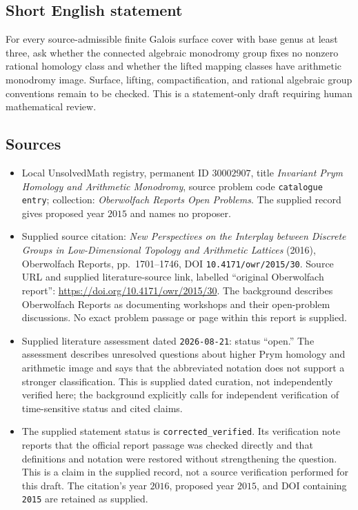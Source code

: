 \documentclass[11pt]{article}
\begin{document}
\subsection{Short English statement}
For every source-admissible finite Galois surface cover with base genus at least three, ask whether the connected algebraic monodromy group fixes no nonzero rational homology class and whether the lifted mapping classes have arithmetic monodromy image. Surface, lifting, compactification, and rational algebraic group conventions remain to be checked. This is a statement-only draft requiring human mathematical review.
\subsection{Sources}
\begin{itemize}
\item Local UnsolvedMath registry, permanent ID \(30002907\), title \emph{Invariant Prym Homology and Arithmetic Monodromy}, source problem code \texttt{catalogue entry}; collection: \emph{Oberwolfach Reports Open Problems}. The supplied record gives proposed year \(2015\) and names no proposer.
\item Supplied source citation: \emph{New Perspectives on the Interplay between Discrete Groups in Low-Dimensional Topology and Arithmetic Lattices} (2016), Oberwolfach Reports, pp.\ 1701--1746, DOI \texttt{10.4171/owr/2015/30}. Source URL and supplied literature-source link, labelled ``original Oberwolfach report'': \url{https://doi.org/10.4171/owr/2015/30}. The background describes Oberwolfach Reports as documenting workshops and their open-problem discussions. No exact problem passage or page within this report is supplied.
\item Supplied literature assessment dated \texttt{2026-08-21}: status ``open.'' The assessment describes unresolved questions about higher Prym homology and arithmetic image and says that the abbreviated notation does not support a stronger classification. This is supplied dated curation, not independently verified here; the background explicitly calls for independent verification of time-sensitive status and cited claims.
\item The supplied statement status is \texttt{corrected\_verified}. Its verification note reports that the official report passage was checked directly and that definitions and notation were restored without strengthening the question. This is a claim in the supplied record, not a source verification performed for this draft. The citation's year \(2016\), proposed year \(2015\), and DOI containing \texttt{2015} are retained as supplied.
\end{itemize}
\end{document}
